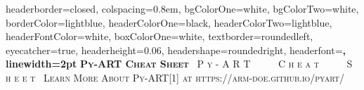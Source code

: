 \documentclass[potrait, z1paper, fontscale=0.33]{baposter} %
\begin{document}
\begin{poster}
{\begin{flushleft}
\begin{tabular}{@{}ll@{}}
\end{tabular}
\end{flushleft}

}

\end{poster}
\newpage


\begin{poster}
{
headerborder=closed, colspacing=0.8em, bgColorOne=white, bgColorTwo=white, borderColor=lightblue, headerColorOne=black, headerColorTwo=lightblue, 
headerFontColor=white, boxColorOne=white, textborder=roundedleft, eyecatcher=true, headerheight=0.06\textheight, headershape=roundedright, headerfont=\Large\bf\textsc, linewidth=2pt 
}
{\bf\textsc{Py-ART Cheat Sheet}\vspace{0.5em}} %
{\textsc{\ P y - A R T \ \ \ \ \ C h e a t \ \ \ \ \ S h e e t\ \hspace{12pt}}}
{\textsc{Learn More About Py-ART[1] at https://arm-doe.github.io/pyart/ \hspace{12pt}}} 


\end{poster}
\end{document}
